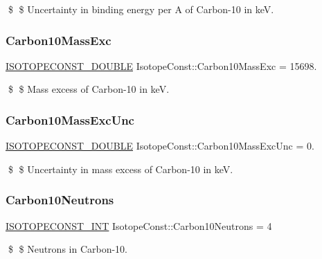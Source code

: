 \$ \$ Uncertainty in binding energy per A of Carbon-\/10 in keV. \mbox{\label{group___isotope_const-_carbon-_c10_ga22db2e09a0d8254c9a209933d21d68dd}} 
\subsubsection{\texorpdfstring{Carbon10\+Mass\+Exc}{Carbon10MassExc}}
{\footnotesize\ttfamily \mbox{\hyperlink{group___isotope_const-_macros_ga8f45a7272ce02c0b4c65c44636ed719a}{I\+S\+O\+T\+O\+P\+E\+C\+O\+N\+S\+T\+\_\+\+D\+O\+U\+B\+LE}} Isotope\+Const\+::\+Carbon10\+Mass\+Exc = 15698.}

\$ \$ Mass excess of Carbon-\/10 in keV. \mbox{\label{group___isotope_const-_carbon-_c10_ga6943638da5b5566e5a02cb5d623312d4}} 
\subsubsection{\texorpdfstring{Carbon10\+Mass\+Exc\+Unc}{Carbon10MassExcUnc}}
{\footnotesize\ttfamily \mbox{\hyperlink{group___isotope_const-_macros_ga8f45a7272ce02c0b4c65c44636ed719a}{I\+S\+O\+T\+O\+P\+E\+C\+O\+N\+S\+T\+\_\+\+D\+O\+U\+B\+LE}} Isotope\+Const\+::\+Carbon10\+Mass\+Exc\+Unc = 0.}

\$ \$ Uncertainty in mass excess of Carbon-\/10 in keV. \mbox{\label{group___isotope_const-_carbon-_c10_gaf21f30df58a2d0ade0b9c7b1cb47515b}} 
\subsubsection{\texorpdfstring{Carbon10\+Neutrons}{Carbon10Neutrons}}
{\footnotesize\ttfamily \mbox{\hyperlink{group___isotope_const-_macros_ga5f18360b3e99483a35c32d789e62621c}{I\+S\+O\+T\+O\+P\+E\+C\+O\+N\+S\+T\+\_\+\+I\+NT}} Isotope\+Const\+::\+Carbon10\+Neutrons = 4}

\$ \$ Neutrons in Carbon-\/10. \mbox{\label{group___isotope_const-_carbon-_c10_ga1d4bf7ad6bbf0257c909f63882f34ae7}} 
